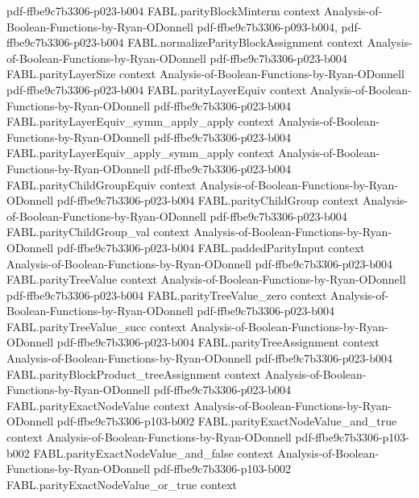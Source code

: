 \begin{theorem}
  {pdf-ffbe9c7b3306-p023-b004}
\proofstep
  {FABL.parityBlockMinterm}
  {context}
  {Analysis-of-Boolean-Functions-by-Ryan-ODonnell}
  {pdf-ffbe9c7b3306-p093-b004,
    pdf-ffbe9c7b3306-p023-b004}
\proofstep
  {FABL.normalizeParityBlockAssignment}
  {context}
  {Analysis-of-Boolean-Functions-by-Ryan-ODonnell}
  {pdf-ffbe9c7b3306-p023-b004}
\proofstep
  {FABL.parityLayerSize}
  {context}
  {Analysis-of-Boolean-Functions-by-Ryan-ODonnell}
  {pdf-ffbe9c7b3306-p023-b004}
\proofstep
  {FABL.parityLayerEquiv}
  {context}
  {Analysis-of-Boolean-Functions-by-Ryan-ODonnell}
  {pdf-ffbe9c7b3306-p023-b004}
\proofstep
  {FABL.parityLayerEquiv_symm_apply_apply}
  {context}
  {Analysis-of-Boolean-Functions-by-Ryan-ODonnell}
  {pdf-ffbe9c7b3306-p023-b004}
\proofstep
  {FABL.parityLayerEquiv_apply_symm_apply}
  {context}
  {Analysis-of-Boolean-Functions-by-Ryan-ODonnell}
  {pdf-ffbe9c7b3306-p023-b004}
\proofstep
  {FABL.parityChildGroupEquiv}
  {context}
  {Analysis-of-Boolean-Functions-by-Ryan-ODonnell}
  {pdf-ffbe9c7b3306-p023-b004}
\proofstep
  {FABL.parityChildGroup}
  {context}
  {Analysis-of-Boolean-Functions-by-Ryan-ODonnell}
  {pdf-ffbe9c7b3306-p023-b004}
\proofstep
  {FABL.parityChildGroup_val}
  {context}
  {Analysis-of-Boolean-Functions-by-Ryan-ODonnell}
  {pdf-ffbe9c7b3306-p023-b004}
\proofstep
  {FABL.paddedParityInput}
  {context}
  {Analysis-of-Boolean-Functions-by-Ryan-ODonnell}
  {pdf-ffbe9c7b3306-p023-b004}
\proofstep
  {FABL.parityTreeValue}
  {context}
  {Analysis-of-Boolean-Functions-by-Ryan-ODonnell}
  {pdf-ffbe9c7b3306-p023-b004}
\proofstep
  {FABL.parityTreeValue_zero}
  {context}
  {Analysis-of-Boolean-Functions-by-Ryan-ODonnell}
  {pdf-ffbe9c7b3306-p023-b004}
\proofstep
  {FABL.parityTreeValue_succ}
  {context}
  {Analysis-of-Boolean-Functions-by-Ryan-ODonnell}
  {pdf-ffbe9c7b3306-p023-b004}
\proofstep
  {FABL.parityTreeAssignment}
  {context}
  {Analysis-of-Boolean-Functions-by-Ryan-ODonnell}
  {pdf-ffbe9c7b3306-p023-b004}
\proofstep
  {FABL.parityBlockProduct_treeAssignment}
  {context}
  {Analysis-of-Boolean-Functions-by-Ryan-ODonnell}
  {pdf-ffbe9c7b3306-p023-b004}
\proofstep
  {FABL.parityExactNodeValue}
  {context}
  {Analysis-of-Boolean-Functions-by-Ryan-ODonnell}
  {pdf-ffbe9c7b3306-p103-b002}
\proofstep
  {FABL.parityExactNodeValue_and_true}
  {context}
  {Analysis-of-Boolean-Functions-by-Ryan-ODonnell}
  {pdf-ffbe9c7b3306-p103-b002}
\proofstep
  {FABL.parityExactNodeValue_and_false}
  {context}
  {Analysis-of-Boolean-Functions-by-Ryan-ODonnell}
  {pdf-ffbe9c7b3306-p103-b002}
\proofstep
  {FABL.parityExactNodeValue_or_true}
  {context}

\end{theorem}
